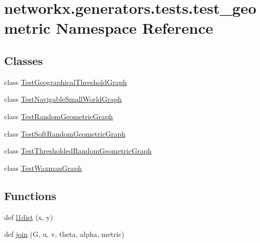 \hypertarget{namespacenetworkx_1_1generators_1_1tests_1_1test__geometric}{}\section{networkx.\+generators.\+tests.\+test\+\_\+geometric Namespace Reference}
\label{namespacenetworkx_1_1generators_1_1tests_1_1test__geometric}
\subsection*{Classes}
\begin{DoxyCompactItemize}
\item 
class \hyperlink{classnetworkx_1_1generators_1_1tests_1_1test__geometric_1_1TestGeographicalThresholdGraph}{Test\+Geographical\+Threshold\+Graph}
\item 
class \hyperlink{classnetworkx_1_1generators_1_1tests_1_1test__geometric_1_1TestNavigableSmallWorldGraph}{Test\+Navigable\+Small\+World\+Graph}
\item 
class \hyperlink{classnetworkx_1_1generators_1_1tests_1_1test__geometric_1_1TestRandomGeometricGraph}{Test\+Random\+Geometric\+Graph}
\item 
class \hyperlink{classnetworkx_1_1generators_1_1tests_1_1test__geometric_1_1TestSoftRandomGeometricGraph}{Test\+Soft\+Random\+Geometric\+Graph}
\item 
class \hyperlink{classnetworkx_1_1generators_1_1tests_1_1test__geometric_1_1TestThresholdedRandomGeometricGraph}{Test\+Thresholded\+Random\+Geometric\+Graph}
\item 
class \hyperlink{classnetworkx_1_1generators_1_1tests_1_1test__geometric_1_1TestWaxmanGraph}{Test\+Waxman\+Graph}
\end{DoxyCompactItemize}
\subsection*{Functions}
\begin{DoxyCompactItemize}
\item 
def \hyperlink{namespacenetworkx_1_1generators_1_1tests_1_1test__geometric_a254be542721af083d80e4982d606776f}{l1dist} (x, y)
\item 
def \hyperlink{namespacenetworkx_1_1generators_1_1tests_1_1test__geometric_ad9197c0900f67ef045a5b97872578308}{join} (G, u, v, theta, alpha, metric)
\end{DoxyCompactItemize}


